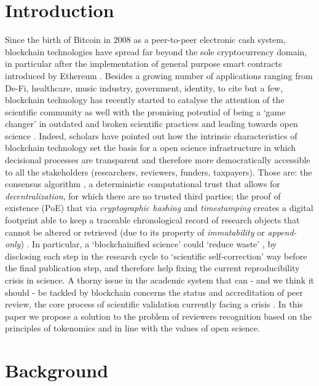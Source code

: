 \documentclass[runningheads]{llncs}
\begin{document}
\section{Introduction}
Since the birth of Bitcoin \cite{BitcoinSatoshi} in 2008 as a peer-to-peer electronic cash system, blockchain technologies have spread far beyond the sole cryptocurrency domain, in particular after the implementation of general purpose smart contracts introduced by Ethereum \cite{Ethereum-Wood}.
Besides a growing number of applications ranging from De-Fi, healthcare, music industry, government, identity, to cite but a few, blockchain technology has recently started to catalyse the attention of the scientific community as well \cite{Bitcoin-Nature-focus,vanRossum2017-DigSci} with the promising potential of being a `game changer' in outdated and broken scientific practices and leading towards open science \cite{AES}. Indeed, scholars have pointed out how the intrinsic characteristics of blockchain technology set the basis for a open science infrastructure \cite{ReviewBlockchain2019} in which decisional processes are transparent and therefore more democratically accessible to all the stakeholders (researchers, reviewers, funders, taxpayers). Those are: the consensus algorithm \cite{ConsAlg}, a deterministic computational trust that allows for \emph{decentralization}, for which there are no trusted third parties; the proof of existence (PoE) that via \emph{cryptographic hashing} and \emph{timestamping} creates a digital footprint able to keep a traceable chronological record of research objects that cannot be altered or retrieved (due to its property of \emph{immutability} or \emph{append-only}) \cite{ReviewBlockchain2019}. In particular, a `blockchainified science' \cite{BlockchainforScience} could `reduce waste' \cite{ReducingWaste-Lancet}, by disclosing each step in the research cycle to `scientific self-correction' way before the final publication step, and therefore help fixing the current reproducibility crisis in science.
\newline A thorny issue in the academic system that can - and we think it should - be tackled by blockchain concerns the status and accreditation of peer review, the core process of scientific validation currently facing a crisis \cite{Gropp-PeerRevStress}.
In this paper we propose a solution to the problem of reviewers recognition based on the principles of tokenomics \cite{TokenEcon} and in line with the values of open science.

\section{Background}
\end{document}
